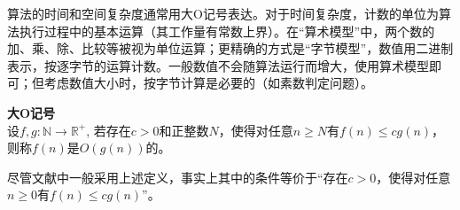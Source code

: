 
\par 算法的时间和空间复杂度通常用大O记号表达。对于时间复杂度，计数的单位为算法执行过程中的基本运算（其工作量有常数上界）。在“算术模型”中，两个数的加、乘、除、比较等被视为单位运算；更精确的方式是“字节模型”，数值用二进制表示，按逐字节的运算计数。一般数值不会随算法运行而增大，使用算术模型即可；但考虑数值大小时，按字节计算是必要的（如素数判定问题）。

\begin{dfn} \textbf{大O记号}\\
设$f,g: \mathbb{N}\to \mathbb{R}^+$, 若存在$c>0$和正整数$N$，使得对任意$n\ge N$有$f(n)\le cg(n)$，则称$f(n)$是$O(g(n))$的。
\end{dfn}

\par 尽管文献中一般采用上述定义，事实上其中的条件等价于“存在$c>0$，使得对任意$n\ge 0$有$f(n)\le cg(n)$”。
